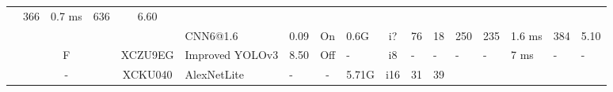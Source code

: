 \documentclass{article}
\begin{document}
\begin{table}
\begin{adjustbox}{totalheight=\baselineskip,}
\begin{tabular}{ccccclp{2em}cp{3em}cp{2em}p{4em}p{3em}p{3.5em}p{3.5em}p{2.5em}p{3em}}
                                                   &\multirow{1}{*}{366}
                                                       &\multirow{1}{*}{0.7 ms}
                                                           &\multirow{1}{*}{636}
                                                               &\multirow{1}{*}{6.60}\\
   &   &   &   &   &\multirow{1}{*}{CNN6@1.6}
                       &\multirow{1}{*}{0.09}
                           &\multirow{1}{*}{On}
                               &\multirow{1}{*}{0.6G}
                                   &\multirow{1}{*}{i?}
                                       &\multirow{1}{*}{76}
                                           &\multirow{1}{*}{18}
                                               &\multirow{1}{*}{250}
                                                   &\multirow{1}{*}{235}
                                                       &\multirow{1}{*}{1.6 ms}
                                                           &\multirow{1}{*}{384}
                                                               &\multirow{1}{*}{5.10}\\
\cmidrule{3-17}
   &   &\multirow{1}{*}{F}
           &\multirow{1}{*}{\cite{wuDesignImplementationRemote2021}}
               &\multirow{1}{*}{XCZU9EG}
                   &\multirow{1}{*}{Improved YOLOv3}
                       &\multirow{1}{*}{8.50}
                           &\multirow{1}{*}{Off}
                               &\multirow{1}{*}{-}
                                   &\multirow{1}{*}{i8}
                                       &\multirow{1}{*}{-}
                                           &\multirow{1}{*}{-}
                                               &\multirow{1}{*}{-}
                                                   &\multirow{1}{*}{-}
                                                       &\multirow{1}{*}{7 ms}
                                                           &\multirow{1}{*}{-}
                                                               &\multirow{1}{*}{-}\\
\cmidrule{3-17}
   &   &\multirow{2}{*}{-}
           &\multirow{2}{*}{\cite{nerisFPGABasedImplementationCNN2022a}}
               &\multirow{2}{*}{XCKU040}
                   &\multirow{1}{*}{AlexNetLite}
                       &\multirow{1}{*}{-}
                           &\multirow{1}{*}{-}
                               &\multirow{1}{*}{5.71G}
                                   &\multirow{1}{*}{i16}
                                       &\multirow{1}{*}{31}
                                           &\multirow{1}{*}{39}

\end{tabular}
\end{adjustbox}
\end{table}
\end{document}
